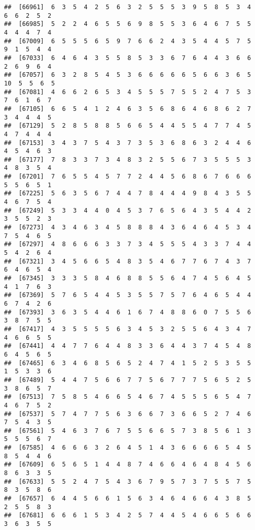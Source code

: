 \documentclass[
]{book}
\begin{document}
\begin{verbatim}
##  [66961]  6  3  5  4  2  5  6  3  2  5  5  5  3  9  5  8  5  3  4  6  6  2  5  2
##  [66985]  5  2  2  4  6  5  5  6  9  8  5  5  3  6  4  6  7  5  5  4  4  4  7  4
##  [67009]  6  5  5  5  6  5  9  7  6  6  2  4  3  5  4  4  5  7  5  9  1  5  4  4
##  [67033]  6  4  6  4  3  5  5  8  5  3  3  6  7  6  4  4  3  6  6  2  6  9  6  4
##  [67057]  6  3  2  8  5  4  5  3  6  6  6  6  6  5  6  6  3  6  5 10  5  5  6  5
##  [67081]  4  6  6  2  6  5  3  4  5  5  5  7  5  5  2  4  7  5  3  7  6  1  6  7
##  [67105]  6  6  5  4  1  2  4  6  3  5  6  8  6  4  6  8  6  2  7  3  4  4  4  5
##  [67129]  5  2  8  5  8  8  5  6  6  5  4  4  5  5  4  7  7  4  5  4  7  4  4  4
##  [67153]  3  4  3  7  5  4  3  7  3  5  3  6  8  6  3  2  4  4  6  4  5  4  6  3
##  [67177]  7  8  3  3  7  3  4  8  3  2  5  5  6  7  3  5  5  5  3  4  8  3  5  4
##  [67201]  7  6  5  5  4  5  7  7  2  4  4  5  6  8  6  7  6  6  6  5  5  6  5  1
##  [67225]  5  6  3  5  6  7  4  4  7  8  4  4  4  9  8  4  3  5  5  4  6  7  5  4
##  [67249]  5  3  3  4  4  0  4  5  3  7  6  5  6  4  3  5  4  4  2  3  5  5  2  3
##  [67273]  4  3  4  6  3  4  5  8  8  8  4  3  6  4  6  4  5  3  4  7  5  4  6  5
##  [67297]  4  8  6  6  6  3  3  7  3  4  5  5  5  4  3  3  7  4  4  5  4  2  6  4
##  [67321]  3  4  5  6  6  5  4  8  3  5  4  6  7  7  6  7  4  3  7  6  4  6  5  4
##  [67345]  3  3  3  5  8  4  6  8  8  5  5  6  4  7  4  5  6  4  5  4  1  7  6  3
##  [67369]  5  7  6  5  4  4  5  3  5  5  7  5  7  6  4  6  5  4  4  6  7  4  2  6
##  [67393]  3  6  3  5  4  4  6  1  6  7  4  8  8  6  0  7  5  5  6  3  8  7  5  5
##  [67417]  4  3  5  5  5  5  6  3  4  5  3  2  5  5  6  4  3  4  7  4  6  6  5  5
##  [67441]  4  4  7  7  6  4  4  8  3  3  6  4  4  3  7  4  5  4  8  6  4  5  6  5
##  [67465]  6  3  4  6  8  5  6  5  2  4  7  4  1  5  2  5  3  5  5  1  5  3  3  6
##  [67489]  5  4  4  7  5  6  6  7  7  5  6  7  7  7  5  6  5  2  5  3  8  6  5  7
##  [67513]  7  5  8  5  4  6  6  5  4  6  7  4  5  5  5  6  5  4  7  4  6  7  5  2
##  [67537]  5  7  4  7  7  5  6  3  6  6  7  3  6  6  5  2  7  4  6  7  5  4  3  5
##  [67561]  5  4  6  3  7  6  7  5  5  6  6  5  7  3  8  5  6  1  3  5  5  5  6  7
##  [67585]  4  6  6  6  3  2  6  4  5  1  4  3  6  6  6  6  5  4  5  8  5  4  4  6
##  [67609]  6  5  6  5  1  4  4  8  7  4  6  6  4  6  4  8  4  5  6  8  6  3  3  5
##  [67633]  5  5  2  4  7  5  4  3  6  7  9  5  7  3  7  5  5  7  5  8  3  5  8  6
##  [67657]  6  4  4  5  6  6  1  5  6  3  4  6  4  6  6  4  3  8  5  2  5  5  8  3
##  [67681]  6  6  6  1  5  3  4  2  5  7  4  4  5  4  6  6  5  6  6  3  6  3  5  5

\end{verbatim}
\end{document}
